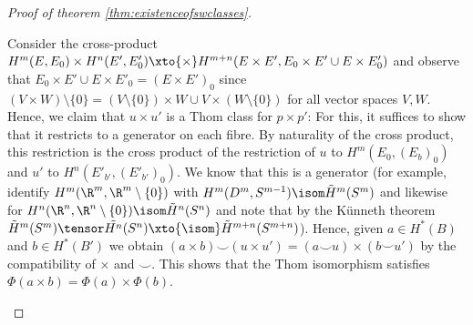 \begin{proof}[Proof of theorem \ref{thm:existenceofswclasses}]
\begin{enumerate}
			Consider the cross-product $H^m(E, E_0) \times H^n(E', E'_0) \xto{\times} H^{m + n}(E \times E', E_0 \times E' \cup E \times E'_0)$ and observe that $E_0 \times E' \cup E \times E'_0 = (E \times E')_0$ since $(V \times W) \setminus \{0\} = (V \setminus \{0\}) \times W \cup V \times (W \setminus \{0\})$ for all vector spaces $V, W$.
			Hence, we claim that $u \times u'$ is a Thom class for $p \times p'$:
			For this, it suffices to show that it restricts to a generator on each fibre.
			By naturality of the cross product, this restriction is the cross product of the restriction of $u$ to $H^m(E_0, (E_b)_0)$ and $u'$ to $H^n(E'_{b'}, (E'_{b'})_0)$.
			We know that this is a generator (for example, identify $H^m(\R^m, \R^m \setminus \{0\})$ with $H^m(D^m, S^{m - 1}) \isom \tilde{H}^m(S^m)$ and likewise for $H^n(\R^n, \R^n \setminus \{0\}) \isom \tilde{H}^n(S^n)$ and note that by the Künneth theorem $\tilde{H}^m(S^m) \tensor \tilde{H^n}(S^n) \xto{\isom} \tilde{H}^{m + n}(S^{m + n})$).
			Hence, given $a \in H^*(B)$ and $b \in H^*(B')$ we obtain $(a \times b) \smile (u \times u') = (a \smile u) \times (b \smile u')$ by the compatibility of $\times$ and $\smile$.
			This shows that the Thom isomorphism satisfies $\Phi(a \times b) = \Phi(a) \times \Phi(b)$.


\end{enumerate}
\end{proof}
